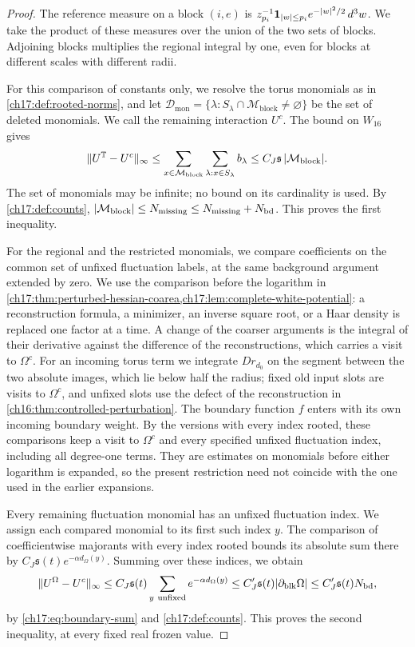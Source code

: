 \begin{proof}
The reference measure on a block $(i,e)$ is $z_{p_i}^{-1}\mathbf 1_{\lvert w\rvert\le p_i}e^{-\lvert w\rvert^2/2}\,d^3w$. We take the product of these measures over the union of the two sets of blocks. Adjoining blocks multiplies the regional integral by one, even for blocks at different scales with different radii.

For this comparison of constants only, we resolve the torus monomials as in \cref{ch17:def:rooted-norms}, and let $\mathcal D_{\mathrm{mon}}=\{\lambda:S_\lambda\cap\mathcal M_{\mathrm{block}}\ne\varnothing\}$ be the set of deleted monomials. We call the remaining interaction $U^c$. The bound on $W_{16}$ gives
\[
 \lVert U^{\mathbb T}-U^c\rVert_\infty\le\sum_{x\in\mathcal M_{\mathrm{block}}}\sum_{\lambda:x\in S_\lambda}b_\lambda\le C_J\mathfrak s\,\lvert \mathcal M_{\mathrm{block}}\rvert.
\]
The set of monomials may be infinite; no bound on its cardinality is used. By \cref{ch17:def:counts}, $\lvert \mathcal M_{\mathrm{block}}\rvert\le N_{\mathrm{missing}}\le N_{\mathrm{missing}}+N_{\mathrm{bd}}$. This proves the first inequality.

For the regional and the restricted monomials, we compare coefficients on the common set of unfixed fluctuation labels, at the same background argument extended by zero. We use the comparison before the logarithm in \cref{ch17:thm:perturbed-hessian-coarea,ch17:lem:complete-white-potential}: a reconstruction formula, a minimizer, an inverse square root, or a Haar density is replaced one factor at a time. A change of the coarser arguments is the integral of their derivative against the difference of the reconstructions, which carries a visit to $\Omega^c$. For an incoming torus term we integrate $Dr_{d_0}$ on the segment between the two absolute images, which lie below half the radius; fixed old input slots are visits to $\Omega^c$, and unfixed slots use the defect of the reconstruction in \cref{ch16:thm:controlled-perturbation}. The boundary function $f$ enters with its own incoming boundary weight. By the versions with every index rooted, these comparisons keep a visit to $\Omega^c$ and every specified unfixed fluctuation index, including all degree-one terms. They are estimates on monomials before either logarithm is expanded, so the present restriction need not coincide with the one used in the earlier expansions.

Every remaining fluctuation monomial has an unfixed fluctuation index. We assign each compared monomial to its first such index $y$. The comparison of coefficientwise majorants with every index rooted bounds its absolute sum there by $C_J\mathfrak s(t)e^{-\alpha d_\Omega(y)}$. Summing over these indices, we obtain
\[
 \lVert U^\Omega-U^c\rVert_\infty\le C_J\mathfrak s(t)\sum_{y\ \mathrm{unfixed}}e^{-\alpha d_\Omega(y)}\le C_J'\mathfrak s(t)\lvert \partial_{\mathrm{blk}}\Omega\rvert\le C_J'\mathfrak s(t)N_{\mathrm{bd}},
\]
by \eqref{ch17:eq:boundary-sum} and \cref{ch17:def:counts}. This proves the second inequality, at every fixed real frozen value.


\end{proof}
